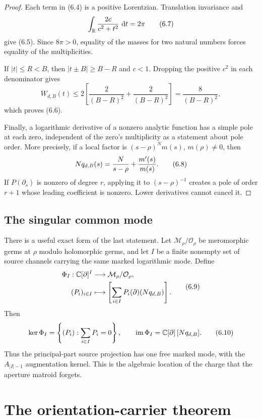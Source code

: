 \documentclass[11pt]{article}
\theoremstyle{definition}
\theoremstyle{remark}
\newcommand{\C}{\mathbb C}
\newcommand{\R}{\mathbb R}
\newcommand{\dd}{\,\mathrm d}
\newcommand{\eqtag}[1]{\qquad\text{\upshape(#1)}}
\begin{document}
\begin{proof}
Each term in (6.4) is a positive Lorentzian.  Translation invariance and
\[
  \int_{\R}\frac{2c}{c^2+t^2}\,\dd t=2\pi            \eqtag{6.7}
\]
give (6.5).  Since \(8\pi>0\), equality of the masses for two natural
numbers forces equality of the multiplicities.

If \(|t|\leq R<B\), then
\(
|t\pm B|\geq B-R
\)
and \(c<1\).  Dropping the positive \(c^2\) in each denominator gives
\[
 W_{d,B}(t)
 \leq2\left[\frac2{(B-R)^2}+\frac2{(B-R)^2}\right]
 =\frac8{(B-R)^2},
\]
which proves (6.6).

Finally, a logarithmic derivative of a nonzero analytic function has a
simple pole at each zero, independent of the zero's multiplicity as a
statement about pole order.  More precisely, if a local factor is
\((s-\rho)^Nm(s)\), \(m(\rho)\neq0\), then
\[
  Nq_{d,B}(s)=\frac{N}{s-\rho}+\frac{m'(s)}{m(s)}.    \eqtag{6.8}
\]
If \(P(\partial_s)\) is nonzero of degree \(r\), applying it to
\((s-\rho)^{-1}\) creates a pole of order \(r+1\) whose leading
coefficient is nonzero.  Lower derivatives cannot cancel it.
\end{proof}

\subsection{The singular common mode}

There is a useful exact form of the last statement.  Let
\(\mathcal M_\rho/\mathcal O_\rho\) be meromorphic germs at \(\rho\)
modulo holomorphic germs, and let \(I\) be a finite nonempty set of
source channels carrying the same marked logarithmic mode.  Define
\[
\begin{aligned}
\Phi_I:\C[\partial]^{I}
   &\longrightarrow \mathcal M_\rho/\mathcal O_\rho,\\
 (P_i)_{i\in I}
   &\longmapsto
\left[\sum_{i\in I}P_i(\partial)(Nq_{d,B})\right].
\end{aligned}                                                        \eqtag{6.9}
\]
Then
\[
 \ker\Phi_I
 =\left\{(P_i):\sum_{i\in I}P_i=0\right\},\qquad
 \operatorname{im}\Phi_I
 =\C[\partial]\,[Nq_{d,B}].                           \eqtag{6.10}
\]
Thus the principal-part source projection has one free marked mode, with
the \(A_{|I|-1}\) augmentation kernel.  This is the algebraic location
of the charge that the aperture matroid forgets.

\section{The orientation-carrier theorem}
\end{document}
